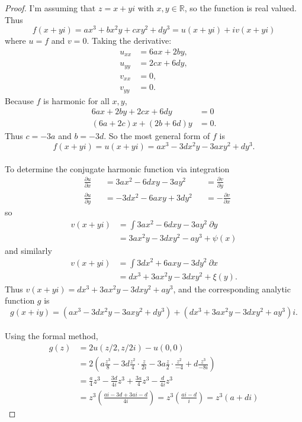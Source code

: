 \documentclass{article}
\begin{document}
\begin{proof}
  I'm assuming that $z = x + yi$ with $x, y \in \mathbb{R}$,
  so the function is real valued. Thus \[
    f(x + yi) = ax^3 + bx^2y + cxy^2 + dy^3 = u(x + yi) + iv(x + yi)
  \] where $u = f$ and $v = 0$. Taking the derivative: \begin{align*}
    u_{xx} &= 6ax + 2by,\\
    u_{yy} &= 2cx + 6dy,\\
    v_{xx} &= 0, \\
    v_{yy} &= 0.
  \end{align*}
  Because $f$ is harmonic for all $x, y$, \begin{align*}
    6ax + 2by + 2cx + 6dy &= 0 \\
    (6a + 2c)x + (2b + 6d)y &= 0.
  \end{align*} Thus $c = -3a$ and $b = -3d$. So the most general form of $f$ is \[
    f(x + yi) = u(x + yi) = ax^3 -3dx^2y -3axy^2 + dy^3.
  \]\\
  To determine the conjugate harmonic function via integration \begin{align*}
    &\frac{\partial u}{\partial x} &&= 3ax^2 -6dxy - 3ay^2 &&= \frac{\partial v}{\partial y}\\
    &\frac{\partial u}{\partial y} &&= -3dx^2 - 6axy + 3dy^2 &&= -\frac{\partial v}{\partial x}
  \end{align*} so \begin{align*}
    v(x + yi) &= \int 3ax^2 -6dxy - 3ay^2\ \partial y \\
    &= 3ax^2y - 3dxy^2 - ay^3 + \psi(x)
  \end{align*} and similarly \begin{align*}
    v(x + yi) &= \int 3dx^2 + 6axy - 3dy^2\ \partial x \\
    &= dx^3 + 3ax^2y - 3dxy^2 + \xi(y).
  \end{align*} Thus $v(x + yi) = dx^3 + 3ax^2y - 3dxy^2 + ay^3$,
  and the corresponding analytic function $g$ is \[
    g(x + iy) = (ax^3 -3dx^2y -3axy^2 + dy^3) + (dx^3 + 3ax^2y - 3dxy^2 + ay^3)i.
  \]\\

  Using the formal method, \begin{align*}
    g(z) &= 2u(z/2, z/2i) - u(0, 0) \\
    &= 2\left(
      a\frac{z^3}{8}
      - 3d\frac{z^2}{4}\cdot\frac{z}{2i}
      - 3a\frac{z}{2} \cdot \frac{z^2}{-4}
      + d\frac{z^3}{-8i}
    \right) \\
    &= \frac{a}{4}{z^3} - \frac{3d}{4i}z^3 +\frac{3a}{4}z^3 - \frac{d}{4i}z^3 \\
    &= z^3\left(
      \frac{ai -3d + 3ai -d}{4i}
    \right)
    = z^3\left(
      \frac{ai -d}{i}
    \right)
    =z^3(a + di)
  \end{align*}

\end{proof}
\end{document}
